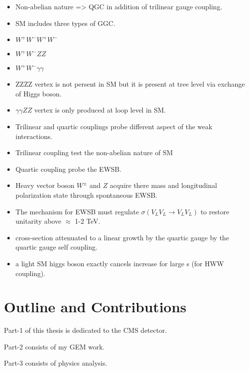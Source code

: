 \begin{itemize}
\item Non-abelian nature => QGC in addition of trilinear gauge coupling.
\item SM includes three types of GGC.
    \item $W^+W^-W^+W^-$
    \item $W^+W^-ZZ$
    \item $W^+W^-\gamma \gamma$
\item ZZZZ vertex is not persent in SM but it is present at tree level via exchange of Higgs boson.
\item $\gamma \gamma ZZ$ vertex is only produced at loop level in SM.
\item Trilinear and quartic couplings probe different aspect of the weak interactions.
    \item Trilinear coupling test the non-abelian nature of SM
    \item Quartic coupling probe the EWSB.
\end{itemize}

\begin{itemize}
\item Heavy vector boson $W^{\pm}$ and $Z$ acquire there mass and longitudinal polarization state through spontaneous EWSB.
\item The mechanism for EWSB must regulate $\sigma(V_LV_L \rightarrow V_LV_L )$ to restore unitarity above $\approx$ 1-2 TeV.
    \item cross-section attenuated to a linear growth by the quartic gauge by the quartic gauge self coupling.
    \item a light SM higgs boson exactly cancels increase for large s (for HWW coupling).
\end{itemize}

\section{Outline and Contributions}


Part-1 of this thesis is dedicated to the CMS detector.

Part-2 consists of my GEM work.

Part-3 consists of physics analysis.

